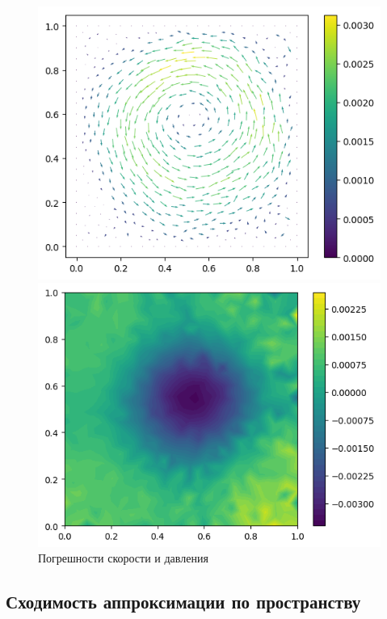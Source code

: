 \documentclass[a4paper,10pt]{report}
\begin{document}
\begin{figure}[H]
    \begin{minipage}{0.49\linewidth}
        \includegraphics[height=0.75\linewidth]{shiftedvortex/eu.png}
    \end{minipage}
    \begin{minipage}{0.49\linewidth}
        \includegraphics[height=0.75\linewidth]{shiftedvortex/ep.png}
    \end{minipage}
    \label{fig:shiftedvortex-error}
    \caption{Погрешности скорости и давления}
\end{figure}

\subsection{Сходимость аппроксимации по пространству}
\end{document}
